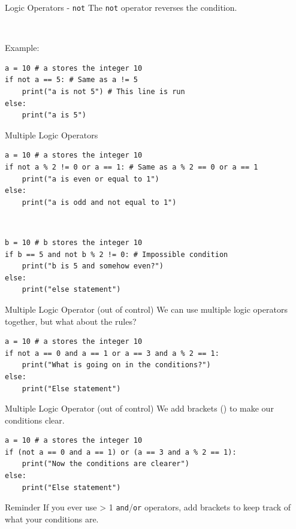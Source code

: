 \documentclass[dvipsnames, svgnames, x11names]{beamer}
\begin{document}
\begin{frame}[fragile]{Logic Operators - \texttt{not}}
The \texttt{not} operator reverses the condition.

\

Example:
\begin{verbatim}
a = 10 # a stores the integer 10
if not a == 5: # Same as a != 5
    print("a is not 5") # This line is run
else:
    print("a is 5")
\end{verbatim}
\end{frame}

\begin{frame}[fragile]{Multiple Logic Operators}
\begin{verbatim}
a = 10 # a stores the integer 10
if not a % 2 != 0 or a == 1: # Same as a % 2 == 0 or a == 1
    print("a is even or equal to 1")
else:
    print("a is odd and not equal to 1")
\end{verbatim}

\

\begin{verbatim}
b = 10 # b stores the integer 10
if b == 5 and not b % 2 != 0: # Impossible condition
    print("b is 5 and somehow even?")
else:
    print("else statement")
\end{verbatim}
\end{frame}

\begin{frame}[fragile]{Multiple Logic Operator (out of control)}
We can use multiple logic operators together, but what about the rules?
\begin{verbatim}
a = 10 # a stores the integer 10
if not a == 0 and a == 1 or a == 3 and a % 2 == 1:
    print("What is going on in the conditions?")
else:
    print("Else statement")
\end{verbatim}
\end{frame}

\begin{frame}[fragile]{Multiple Logic Operator (out of control)}
We add brackets () to make our conditions clear.
\begin{verbatim}
a = 10 # a stores the integer 10
if (not a == 0 and a == 1) or (a == 3 and a % 2 == 1):
    print("Now the conditions are clearer")
else:
    print("Else statement")
\end{verbatim}
\pause
\begin{block}{Reminder}
If you ever use > 1 \texttt{and}/\texttt{or} operators, add brackets to keep track of what your conditions are.
\end{block}
\end{frame}
\end{document}
